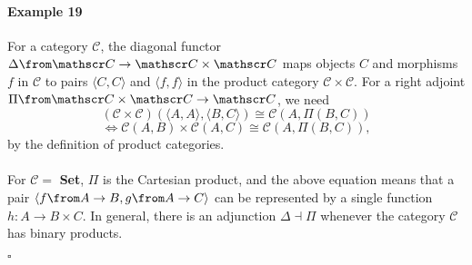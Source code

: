 	 \paragraph{Example 19} 
	For a category $\mathscr C$, the diagonal functor $\Delta \from \mathscr C \to \mathscr C \times \mathscr C$ maps objects $C$ and morphisms $f$ in $\mathscr C$ to pairs $\langle C,C \rangle$ and $\langle f, f \rangle$ in the product category $\mathscr C \times \mathscr C$. For a right adjoint $\Pi \from \mathscr C \times \mathscr C \to \mathscr C$, we need \[(\mathscr C \times \mathscr C)(\langle A, A \rangle, \langle B, C \rangle) \cong \mathscr C (A, \Pi (B,C))\]
\[\Leftrightarrow \mathscr C (A, B) \times \mathscr C (A, C) \cong \mathscr C (A, \Pi (B,C)),\]
by the definition of product categories.\\\\
	For $\mathscr C =$ \textbf{Set}, $\Pi$ is the Cartesian product, and the above equation means that a pair $\langle f \from A \to B, g \from A \to C \rangle$ can be represented by a single function $h: A \to B \times C$. 
	In general, there is an adjunction $\Delta \dashv \Pi$ whenever the category $\mathscr C$ has binary products. {\begin{flushright}$\square$\end{flushright}}
\vspace{\baselineskip}
\vspace{\baselineskip}
